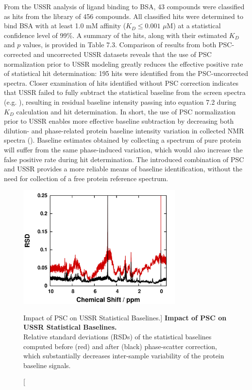\begin{doublespace}
From the USSR analysis of ligand binding to BSA, 43 compounds were classified
as hits from the library of 456 compounds. All classified hits were determined
to bind BSA with at least 1.0 mM affinity ($K_D \le 0.001$ $\mu$M) at a
statistical confidence level of 99\%. A summary of the hits, along with their
estimated $K_D$ and $p$ values, is provided in Table 7.3. Comparison of
results from both PSC-corrected and uncorrected USSR datasets reveals that the
use of PSC normalization prior to USSR modeling greatly reduces the effective
positive rate of statistical hit determination: 195 hits were identified from
the PSC-uncorrected spectra. Closer examination of hits identified without PSC
correction indicates that USSR failed to fully subtract the statistical
baseline from the screen spectra (e.g. ), resulting
in residual baseline intensity passing into equation 7.2 during $K_D$
calculation and hit determination. In short, the use of PSC normalization
prior to USSR enables more effective baseline subtraction by decreasing
both dilution- and phase-related protein baseline intensity variation in
collected \hnmr{} NMR spectra (). Baseline estimates
obtained by collecting a spectrum of pure protein will suffer from the same
phase-induced variation, which would also increase the false positive rate
during hit determination. The introduced combination of PSC and USSR
provides a more reliable means of baseline identification, without
the need for collection of a free protein reference spectrum.
\end{doublespace}

\begin{figure}
\includegraphics[width=3.25in]{figs/ussr/05-rsd.png}
\caption
      [Impact of PSC on USSR Statistical Baselines.]{
  {\bf Impact of PSC on USSR Statistical Baselines.}
  \\
  Relative standard deviations (RSDs) of the statistical baselines computed
  before (red) and after (black) phase-scatter correction, which substantially
  decreases inter-sample variability of the protein baseline signals.
}
\label{figure.7.5}
\end{figure}

